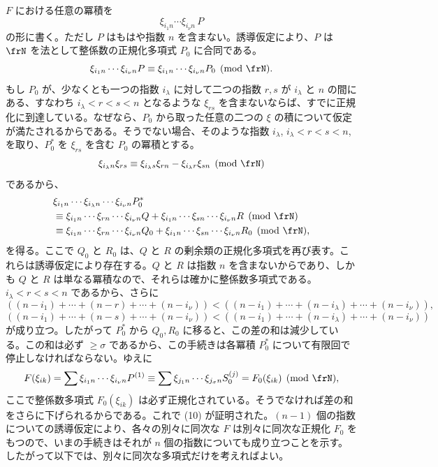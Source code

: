 \documentclass[11pt]{article}
\begin{document}
\(F\) における任意の冪積を
\[
        \xi_{i_1n}\cdots\xi_{i_\nu n}\,P
\]
の形に書く。ただし \(P\) はもはや指数 \(n\) を含まない。誘導仮定により、\(P\) は \(\frN\) を法として整係数の正規化多項式 \(P_0\) に合同である。
\[
        \xi_{i_1n}\cdots\xi_{i_\nu n}P
        \equiv
        \xi_{i_1n}\cdots\xi_{i_\nu n}P_0
        \pmod{\frN}.
\]
もし \(P_0\) が、少なくとも一つの指数 \(i_\lambda\) に対して二つの指数 \(r,s\) が \(i_\lambda\) と \(n\) の間にある、すなわち \(i_\lambda<r<s<n\) となるような \(\xi_{rs}\) を含まないならば、すでに正規化に到達している。なぜなら、\(P_0\) から取った任意の二つの \(\xi\) の積について仮定が満たされるからである。そうでない場合、そのような指数 \(i_\lambda\), \(i_\lambda<r<s<n\), を取り、\(P_0^*\) を \(\xi_{rs}\) を含む \(P_0\) の冪積とする。
\[
        \xi_{i_\lambda n}\xi_{rs}\equiv
        \xi_{i_\lambda s}\xi_{rn}-\xi_{i_\lambda r}\xi_{sn}
        \pmod{\frN}
\]
であるから、
\begin{align*}
 &\xi_{i_1n}\cdots\xi_{i_\lambda n}\cdots\xi_{i_\nu n}P_0^*\\
 &\equiv
 \xi_{i_1n}\cdots\xi_{rn}\cdots\xi_{i_\nu n}Q
 +
 \xi_{i_1n}\cdots\xi_{sn}\cdots\xi_{i_\nu n}R
 \pmod{\frN}\\
 &\equiv
 \xi_{i_1n}\cdots\xi_{rn}\cdots\xi_{i_\nu n}Q_0
 +
 \xi_{i_1n}\cdots\xi_{sn}\cdots\xi_{i_\nu n}R_0
 \pmod{\frN},
\end{align*}
を得る。ここで \(Q_0\) と \(R_0\) は、\(Q\) と \(R\) の剰余類の正規化多項式を再び表す。これらは誘導仮定により存在する。\(Q\) と \(R\) は指数 \(n\) を含まないからであり、しかも \(Q\) と \(R\) は単なる冪積なので、それらは確かに整係数多項式である。\(i_\lambda<r<s<n\) であるから、さらに
\[
 ((n-i_1)+\cdots+(n-r)+\cdots+(n-i_\nu))
 <
 ((n-i_1)+\cdots+(n-i_\lambda)+\cdots+(n-i_\nu)),
\]
\[
 ((n-i_1)+\cdots+(n-s)+\cdots+(n-i_\nu))
 <
 ((n-i_1)+\cdots+(n-i_\lambda)+\cdots+(n-i_\nu))
\]
が成り立つ。したがって \(P_0^*\) から \(Q_0,R_0\) に移ると、この差の和は減少している。この和は必ず \(\ge\sigma\) であるから、この手続きは各冪積 \(P_0^*\) について有限回で停止しなければならない。ゆえに
\[
        F(\xi_{ik})
        =
        \sum \xi_{i_1n}\cdots\xi_{i_\nu n}P^{(1)}
        \equiv
        \sum \xi_{j_1n}\cdots\xi_{j_\sigma n}S_0^{(j)}
        =
        F_0(\xi_{ik})\pmod{\frN},
\]
ここで整係数多項式 \(F_0(\xi_{ik})\) は必ず正規化されている。そうでなければ差の和をさらに下げられるからである。これで (10) が証明された。\((n-1)\) 個の指数についての誘導仮定により、各々の別々に同次な \(F\) は別々に同次な正規化 \(F_0\) をもつので、いまの手続きはそれが \(n\) 個の指数についても成り立つことを示す。したがって以下では、別々に同次な多項式だけを考えればよい。
\end{document}
